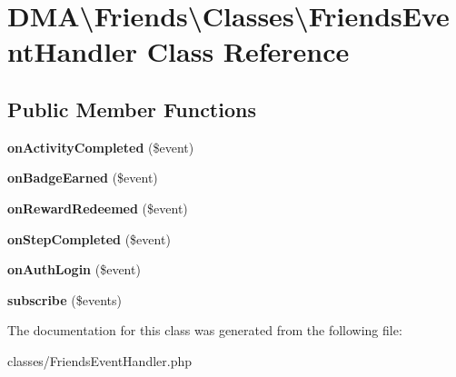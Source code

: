 \hypertarget{classDMA_1_1Friends_1_1Classes_1_1FriendsEventHandler}{\section{D\+M\+A\textbackslash{}Friends\textbackslash{}Classes\textbackslash{}Friends\+Event\+Handler Class Reference}
\label{classDMA_1_1Friends_1_1Classes_1_1FriendsEventHandler}
}
\subsection*{Public Member Functions}
\begin{DoxyCompactItemize}
\item 
\hypertarget{classDMA_1_1Friends_1_1Classes_1_1FriendsEventHandler_aca0544953a69d38c57a9756d3712d900}{{\bfseries on\+Activity\+Completed} (\$event)}\label{classDMA_1_1Friends_1_1Classes_1_1FriendsEventHandler_aca0544953a69d38c57a9756d3712d900}

\item 
\hypertarget{classDMA_1_1Friends_1_1Classes_1_1FriendsEventHandler_a6410881fab2b5c74f546a7585be11201}{{\bfseries on\+Badge\+Earned} (\$event)}\label{classDMA_1_1Friends_1_1Classes_1_1FriendsEventHandler_a6410881fab2b5c74f546a7585be11201}

\item 
\hypertarget{classDMA_1_1Friends_1_1Classes_1_1FriendsEventHandler_a81f3a3f753d8ef9dd4f4f09f37b216bd}{{\bfseries on\+Reward\+Redeemed} (\$event)}\label{classDMA_1_1Friends_1_1Classes_1_1FriendsEventHandler_a81f3a3f753d8ef9dd4f4f09f37b216bd}

\item 
\hypertarget{classDMA_1_1Friends_1_1Classes_1_1FriendsEventHandler_a4d3c29aaa251e727c832b3dc852c0401}{{\bfseries on\+Step\+Completed} (\$event)}\label{classDMA_1_1Friends_1_1Classes_1_1FriendsEventHandler_a4d3c29aaa251e727c832b3dc852c0401}

\item 
\hypertarget{classDMA_1_1Friends_1_1Classes_1_1FriendsEventHandler_a480d5807466962402ccc13260cfb0930}{{\bfseries on\+Auth\+Login} (\$event)}\label{classDMA_1_1Friends_1_1Classes_1_1FriendsEventHandler_a480d5807466962402ccc13260cfb0930}

\item 
\hypertarget{classDMA_1_1Friends_1_1Classes_1_1FriendsEventHandler_a92cad97622be6dd1ed477dcc05d81074}{{\bfseries subscribe} (\$events)}\label{classDMA_1_1Friends_1_1Classes_1_1FriendsEventHandler_a92cad97622be6dd1ed477dcc05d81074}

\end{DoxyCompactItemize}


The documentation for this class was generated from the following file\+:\begin{DoxyCompactItemize}
\item 
classes/Friends\+Event\+Handler.\+php\end{DoxyCompactItemize}
